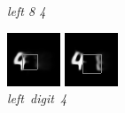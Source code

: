 \documentclass{article} %
\begin{document}
\begin{figure}[t]
  \caption{\textit{left 8 4}}
\endminipage\hfill
{}
  \includegraphics[width=\linewidth]{figures/4-8-9.png}
  \caption{\mbox{\textit{left digit 4}}}
\endminipage\hfill
{}
  \includegraphics[width=\linewidth]{figures/4-8-14.png}

\end{figure}
\end{document}
